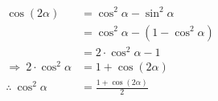 \begin{equation}\label{eq:3}
    \begin{split}
        \cos(2\alpha) &= \cos^2\alpha - \sin^2\alpha\\
        &= \cos^2\alpha - (1 - \cos^2\alpha)\\
        &= 2\cdot \cos^2\alpha - 1\\
        \Rightarrow ~2\cdot \cos^2\alpha &= 1 + \cos(2\alpha)\\
        \therefore ~\cos^2\alpha &= \frac{1 + \cos(2\alpha)}{2}
    \end{split}
\end{equation}

